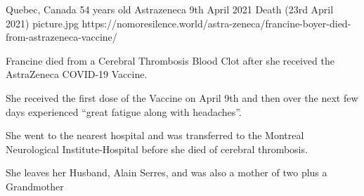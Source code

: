{Quebec, Canada}
{54 years old}
{Astrazeneca}
{9th April 2021}
{Death (23rd April 2021)}
{picture.jpg}
{https://nomoresilence.world/astra-zeneca/francine-boyer-died-from-astrazeneca-vaccine/}
{

Francine died from a Cerebral Thrombosis Blood Clot after she received the
AstraZeneca COVID-19 Vaccine.

She received the first dose of the Vaccine on April 9th and then over the next
few days experienced “great fatigue along with headaches”.

She went to the nearest hospital and was transferred to the Montreal
Neurological Institute-Hospital before she died of cerebral thrombosis.

She leaves her Husband, Alain Serres, and was also a mother of two plus a
Grandmother

}
